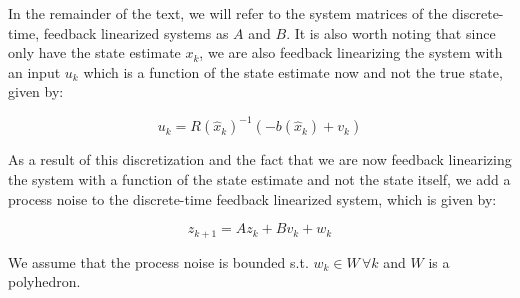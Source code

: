In the remainder of the text, we will refer to the system matrices of the discrete-time, feedback linearized systems as $A$ and $B$. It is also worth noting that since only have the state estimate $x_k$, we are also feedback linearizing the system with an input $u_k$ which is a function of the state estimate now and not the true state, given by:

\begin{equation}
\label{eq:noisy_input}
u_k = R(\hat{x}_k)^{-1}(-b(\hat{x}_k) + v_k)
\end{equation}

As a result of this discretization and the fact that we are now feedback linearizing the system with a function of the state estimate and not the state itself, we add a process noise to the discrete-time feedback linearized system, which is given by:

\begin{equation}
z_{k+1} = Az_k + Bv_k + w_k
\end{equation}

We assume that the process noise is bounded s.t. $w_k \in W\, \forall k$ and $W$ is a polyhedron.